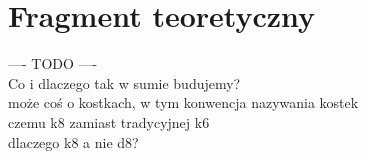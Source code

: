 \chapter{Fragment teoretyczny}\label{ch:fragment-teoretyczny}

---- TODO ---- \\

Co i dlaczego tak w sumie budujemy? \\
może coś o kostkach, w tym konwencja nazywania kostek  \\
czemu k8 zamiast tradycyjnej k6 \\
dlaczego k8 a nie d8?  \\

